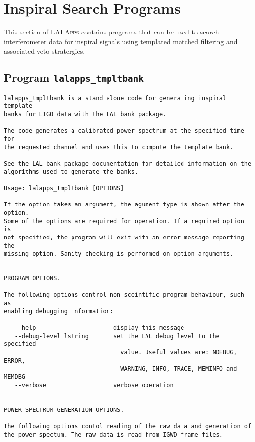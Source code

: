 \section{Inspiral Search Programs}
\label{secion:inspiral}

This section of \textsc{LALApps} contains programs that can be used to search
interferometer data for inspiral signals using templated matched filtering and
associated veto stratergies.

\clearpage
\subsection{Program \texttt{lalapps\_tmpltbank}}
\label{program:lalapps-tmpltbank}

\begin{verbatim}
lalapps_tmpltbank is a stand alone code for generating inspiral template
banks for LIGO data with the LAL bank package.

The code generates a calibrated power spectrum at the specified time for
the requested channel and uses this to compute the template bank.

See the LAL bank package documentation for detailed information on the
algorithms used to generate the banks.

Usage: lalapps_tmpltbank [OPTIONS]

If the option takes an argument, the agument type is shown after the option.
Some of the options are required for operation. If a required option is
not specified, the program will exit with an error message reporting the
missing option. Sanity checking is performed on option arguments.


PROGRAM OPTIONS.

The following options control non-sceintific program behaviour, such as
enabling debugging information:

   --help                      display this message
   --debug-level lstring       set the LAL debug level to the specified
                                 value. Useful values are: NDEBUG, ERROR,
                                 WARNING, INFO, TRACE, MEMINFO and MEMDBG
   --verbose                   verbose operation


POWER SPECTRUM GENERATION OPTIONS.

The following options contol reading of the raw data and generation of 
the power spectum. The raw data is read from IGWD frame files.


\end{verbatim}
